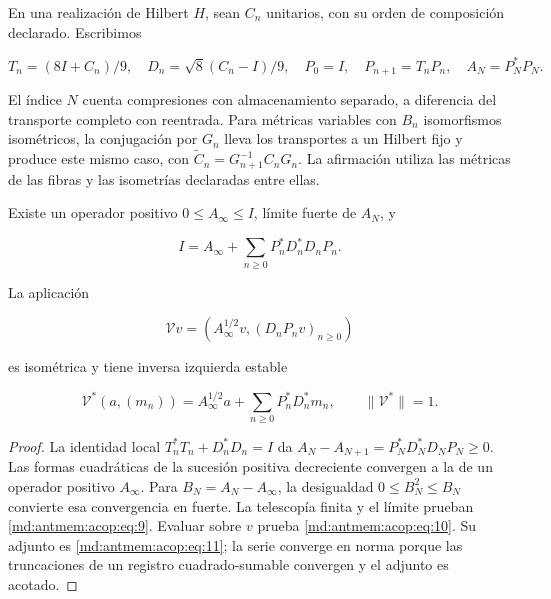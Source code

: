 En una realización de Hilbert \(H\), sean \(C_n\) unitarios, con su orden de composición declarado. Escribimos

\[
T_n=(8I+C_n)/9,\quad D_n=\sqrt8(C_n-I)/9,
\quad P_0=I,\quad P_{n+1}=T_nP_n,\quad A_N=P_N^*P_N.
\]

El índice \(N\) cuenta compresiones con almacenamiento separado, a diferencia del transporte completo con reentrada. Para métricas variables con \(B_n\) isomorfismos isométricos, la conjugación por \(G_n\) lleva los transportes a un Hilbert fijo y produce este mismo caso, con \(\widetilde C_n=G_{n+1}^{-1}C_nG_n\). La afirmación utiliza las métricas de las fibras y las isometrías declaradas entre ellas.

\begin{theorem}
\label{md:antmem:terminal-no-estacionario}
Existe un operador positivo \(0\leq A_\infty\leq I\), límite fuerte de \(A_N\), y

\begin{equation}
\boxed{I=A_\infty+\sum_{n\ge0}P_n^*D_n^*D_nP_n.}
\label{md:antmem:acop:eq:9}
\end{equation}

La aplicación

\begin{equation}
\boxed{\mathcal Vv=(A_\infty^{1/2}v,(D_nP_nv)_{n\ge0})}
\label{md:antmem:acop:eq:10}
\end{equation}

es isométrica y tiene inversa izquierda estable

\begin{equation}
\mathcal V^*(a,(m_n))=A_\infty^{1/2}a+
\sum_{n\ge0}P_n^*D_n^*m_n,\qquad\|\mathcal V^*\|=1.
\label{md:antmem:acop:eq:11}
\end{equation}

\end{theorem}
\begin{proof}
La identidad local \(T_n^*T_n+D_n^*D_n=I\) da
\(A_N-A_{N+1}=P_N^*D_N^*D_NP_N\geq0\). Las formas cuadráticas de
la sucesión positiva decreciente convergen a la de un operador positivo
\(A_\infty\). Para \(B_N=A_N-A_\infty\), la desigualdad
\(0\leq B_N^2\leq B_N\) convierte esa convergencia en fuerte.
La telescopía finita y el límite prueban \eqref{md:antmem:acop:eq:9}. Evaluar sobre \(v\)
prueba \eqref{md:antmem:acop:eq:10}. Su adjunto es \eqref{md:antmem:acop:eq:11}; la serie converge en norma porque
las truncaciones de un registro cuadrado-sumable convergen y el adjunto es acotado.
\end{proof}

